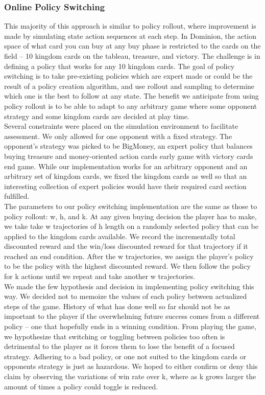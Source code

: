 \documentclass{article}
\begin{document}
\subsubsection{Online Policy Switching}
This majority of this approach is similar to policy rollout, where improvement is made by simulating state action sequences at each step. In Dominion, the action space of what card you can buy at any buy phase is restricted to the cards on the field -- 10 kingdom cards on the tableau, treasure, and victory. The challenge is in defining a policy that works for any 10 kingdom cards. The goal of policy switching is to take pre-existing policies which are expert made or could be the result of a policy creation algorithm, and use rollout and sampling to determine which one is the best to follow at any state. The benefit we anticipate from using policy rollout is to be able to adapt to any arbitrary game where some opponent strategy and some kingdom cards are decided at play time.
\\
Several constraints were placed on the simulation environment to facilitate assessment. We only allowed for one opponent with a fixed strategy. The opponent's strategy was picked to be BigMoney, an expert policy that balances buying treasure and money-oriented action cards early game with victory cards end game. While our implementation works for an arbitrary opponent and an arbitrary set of kingdom cards, we fixed the kingdom cards as well so that an interesting collection of expert policies would have their required card section fulfilled.
\\
The parameters to our policy switching implementation are the same as those to policy rollout: w, h, and k. At any given buying decision the player has to make, we take take w trajectories of h length on a randomly selected policy that can be applied to the kingdom cards available. We record the incrementally total discounted reward and the win/loss discounted reward for that trajectory if it reached an end condition. After the w trajectories, we assign the player’s policy to be the policy with the highest discounted reward. We then follow the policy for k actions until we repeat and take another w trajectories.
\\
We made the few hypothesis and decision in implementing policy switching this way. We decided not to memoize the values of each policy between actualized steps of the game. History of what has done well so far should not be as important to the player if the overwhelming future success comes from a different policy -- one that hopefully ends in a winning condition. From playing the game, we hypothesize that switching or toggling between policies too often is detrimental to the player as it forces them to lose the benefit of a focused strategy. Adhering to a bad policy, or one not suited to the kingdom cards or opponents strategy is just as hazardous. We hoped to either confirm or deny this claim by observing the variations of win rate over k, where as k grows larger the amount of times a policy could toggle is reduced.
\end{document}
